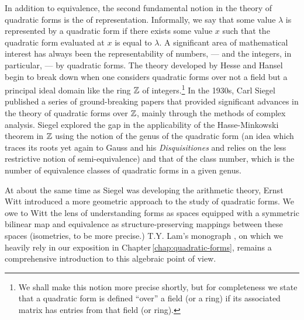 In addition to equivalence, the second fundamental notion in the theory of quadratic forms is the of representation. Informally, we say that some value \(\lambda\) is represented by a quadratic form if there exists some value \(x\) such that the quadratic form evaluated at \(x\) is equal to \(\lambda\). A significant area of mathematical interest has always been the representability of numbers, --- and the integers, in particular, --- by quadratic forms. The theory developed by Hesse and Hansel begin to break down when one considers quadratic forms over not a field but a principal ideal domain like the ring \(\mathbb{Z}\) of integers.\footnote{We shall make this notion more precise shortly, but for completeness we state that a quadratic form is defined ``over'' a field (or a ring) if its associated matrix has entries from that field (or ring).} In the 1930s, Carl Siegel published a series of ground-breaking papers that provided significant advances in the theory of quadratic forms over \(\mathbb{Z}\), mainly through the methods of complex analysis. Siegel explored the gap in the applicability of the Hasse-Minkowski theorem in \(\mathbb{Z}\) using the notion of the genus of the quadratic form (an idea which traces its roots yet again to Gauss and his \emph{Disquisitiones} and relies on the less restrictive notion of semi-equivalence) and that of the class number, which is the number of equivalence classes of quadratic forms in a given genus. \cite{gerstein2008basic}

At about the same time as Siegel was developing the arithmetic theory, Ernst Witt introduced a more geometric approach to the study of quadratic forms. We owe to Witt the lens of understanding forms as spaces equipped with a symmetric bilinear map and equivalence as structure-preserving mappings between these spaces (isometries, to be more precise.) T.Y. Lam's monograph \cite{lam1973quadratic}, on which we heavily rely in our exposition in Chapter\,\ref{chap:quadratic-forms}, remains a comprehensive introduction to this algebraic point of view.